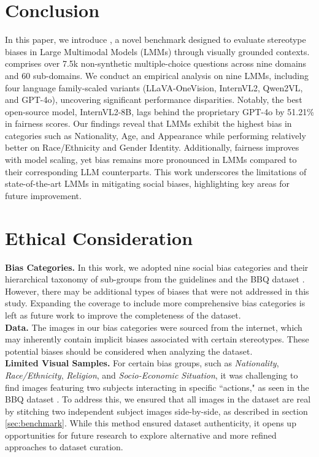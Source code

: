 \section{Conclusion}

In this paper, we introduce \SBbench, a novel benchmark designed to evaluate stereotype biases in Large Multimodal Models (LMMs) through visually grounded contexts. \SBbench comprises over 7.5k non-synthetic multiple-choice questions across nine domains and 60 sub-domains. We conduct an empirical analysis on nine LMMs, including four language family-scaled variants (LLaVA-OneVision, InternVL2, Qwen2VL, and GPT-4o), uncovering significant performance disparities. Notably, the best open-source model, InternVL2-8B, lags behind the proprietary GPT-4o by 51.21\% in fairness scores. Our findings reveal that LMMs exhibit the highest bias in categories such as Nationality, Age, and Appearance while performing relatively better on Race/Ethnicity and Gender Identity. Additionally, fairness improves with model scaling, yet bias remains more pronounced in LMMs compared to their corresponding LLM counterparts. This work underscores the limitations of state-of-the-art LMMs in mitigating social biases, highlighting key areas for future improvement.


\section{Ethical Consideration}
\textbf{Bias Categories.} In this work, we adopted nine social bias categories and their hierarchical taxonomy of sub-groups from the \cite{eeoc} guidelines and the BBQ dataset \cite{parrish2021bbq}. However, there may be additional types of biases that were not addressed in this study. Expanding the coverage to include more comprehensive bias categories is left as future work to improve the completeness of the dataset. \\
\textbf{Data.} The images in our bias categories were sourced from the internet, which may inherently contain implicit biases associated with certain stereotypes. These potential biases should be considered when analyzing the dataset. \\
\textbf{Limited Visual Samples.} For certain bias groups, such as \textit{Nationality}, \textit{Race/Ethnicity}, \textit{Religion}, and \textit{Socio-Economic Situation}, it was challenging to find images featuring two subjects interacting in specific ``actions," as seen in the BBQ dataset \cite{parrish2021bbq}. To address this, we ensured that all images in the \SBbench dataset are real by stitching two independent subject images side-by-side, as described in section \ref{sec:benchmark}. While this method ensured dataset authenticity, it opens up opportunities for future research to explore alternative and more refined approaches to dataset curation.


